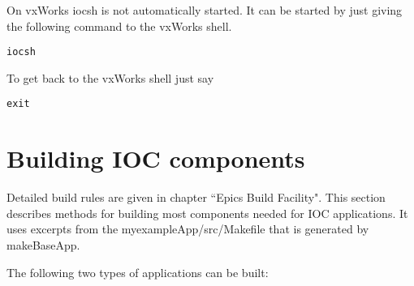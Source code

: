 On vxWorks iocsh is not automatically started. It can be started by just giving the following command to the vxWorks 
shell.

\begin{verbatim}iocsh
\end{verbatim}To get back to the vxWorks shell just say

\begin{verbatim}exit
\end{verbatim}

\section{Building IOC components}

Detailed build rules are given in chapter ``Epics Build Facility". This section describes methods for building most 
components needed for IOC applications. It uses excerpts from the myexampleApp/src/Makefile that is generated by 
makeBaseApp.

The following two types of applications can be built:

